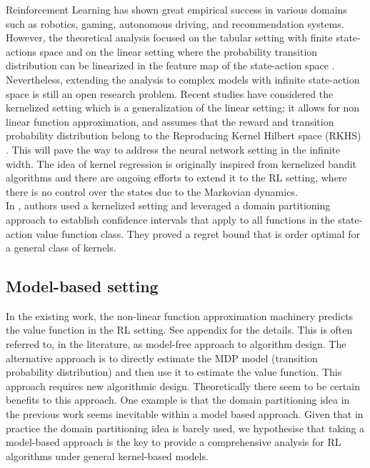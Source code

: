 \documentclass{article}
\begin{document}
Reinforcement Learning has shown great empirical success in various domains such as robotics, gaming, autonomous driving, and recommendation systems. However, the theoretical analysis focused on the tabular setting with finite state-actions space \cite{jin2018q} and on the linear setting where the probability transition distribution can be linearized in the feature map of the state-action space \cite{jin2020provably}. Nevertheless, extending the analysis to complex models with infinite state-action space is still an open research problem. Recent studies have considered the kernelized setting which is a generalization of the linear setting; it allows for non linear function approximation, and assumes that the reward and transition probability distribution belong to the Reproducing Kernel Hilbert space (RKHS) \cite{yang2020provably}. This will pave the way to address the neural network setting in the infinite width. The idea of kernel regression is originally inspired from kernelized bandit algorithms \cite{scarlett2017lower} and there are ongoing efforts to extend it to the RL setting, where there is no control over the states due to the Markovian dynamics. \\
In \cite{vakili2024kernelized}, authors used a kernelized setting and leveraged a  domain partitioning approach to establish confidence intervals that apply to all functions in the state-action value function class. They proved a regret bound that is order optimal for a general class of kernels. 



\subsection{Model-based setting}


In the existing work, the non-linear function approximation machinery predicts the value function in the RL setting. See appendix for the details. This is often referred to,  in the literature, as model-free approach to algorithm design. The alternative approach 
is to directly estimate the MDP model (transition probability distribution) and then use it to estimate the value function. This approach requires new algorithmic design. Theoretically there seem to be certain benefits to this approach. One example is that the domain partitioning idea in the previous work seems inevitable within a model based approach. Given that in practice the domain partitioning idea is barely used, we hypothesise that taking a model-based approach is the key to provide a comprehensive analysis for RL algorithms under general kernel-based models. 
\end{document}
